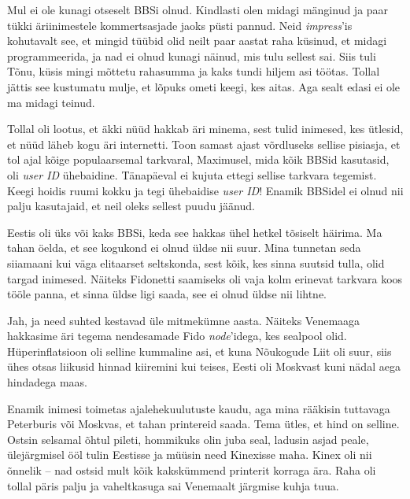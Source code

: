 Mul ei ole kunagi otseselt BBSi olnud. Kindlasti olen midagi mänginud ja paar tükki äriinimestele kommertsasjade jaoks püsti pannud. Neid 
\emph{impress}'is kohutavalt see, et mingid tüübid olid neilt paar 
aastat raha küsinud, et midagi programmeerida, ja nad ei olnud kunagi näinud, 
mis tulu sellest sai. Siis tuli Tõnu, küsis mingi mõttetu 
rahasumma ja kaks tundi hiljem asi töötas. Tollal jättis see
kustumatu mulje, et lõpuks ometi keegi, kes aitas. Aga sealt edasi 
ei ole ma midagi teinud. 


Tollal oli lootus, et äkki nüüd hakkab äri minema, sest tulid inimesed, kes 
ütlesid, et nüüd läheb kogu äri internetti. Toon samast ajast 
võrdluseks sellise pisiasja, et tol ajal kõige populaarsemal tarkvaral, 
Maximusel, mida kõik BBSid kasutasid, oli \emph{user ID} ühebaidine. Tänapäeval ei kujuta ettegi sellise tarkvara tegemist. 
Keegi hoidis ruumi kokku ja tegi ühebaidise \emph{user ID}! Enamik BBSidel ei 
olnud nii palju kasutajaid, et neil oleks sellest puudu jäänud. 


Eestis oli üks või kaks BBSi, keda see hakkas ühel hetkel tõsiselt häirima. Ma 
tahan öelda, et see kogukond ei olnud üldse nii suur. Mina tunnetan seda siiamaani 
kui väga elitaarset seltskonda, sest kõik, kes sinna 
suutsid tulla, olid targad inimesed. Näiteks Fidonetti saamiseks oli vaja kolm erinevat tarkvara koos tööle 
panna, et sinna üldse ligi saada, see ei olnud üldse nii lihtne. 


Jah, ja need suhted kestavad üle mitmekümne aasta. 
Näiteks Venemaaga hakkasime äri tegema nendesamade Fido \emph{node}'idega, 
kes sealpool olid. Hüperinflatsioon oli selline kummaline asi, et kuna 
Nõukogude Liit oli suur, siis ühes otsas liikusid hinnad kiiremini kui teises, 
Eesti oli Moskvast kuni nädal aega hindadega maas. 


Enamik inimesi toimetas ajalehekuulutuste kaudu, aga mina rääkisin tuttavaga Peterburis või Moskvas, et 
tahan printereid saada. Tema ütles, et hind on selline. 
Ostsin selsamal õhtul pileti, hommikuks olin juba seal, ladusin asjad 
peale, ülejärgmisel ööl tulin Eestisse ja müüsin need 
Kinexisse maha. Kinex oli 
nii õnnelik -- nad ostsid mult kõik kakskümmend printerit korraga ära. Raha oli tollal
päris palju ja vaheltkasuga sai Venemaalt järgmise kuhja tuua.

